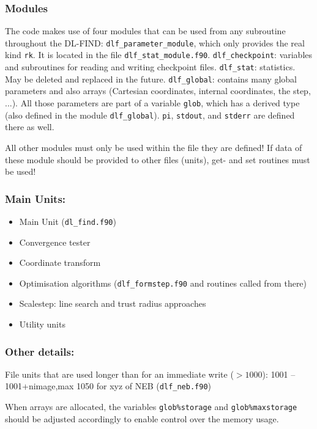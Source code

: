 \documentclass{article}
\begin{document}
\subsubsection{Modules}

The code makes use of four modules that can be used from any subroutine
throughout the DL-FIND: \texttt{dlf\_parameter\_module}, which only provides
the real kind \texttt{rk}. It is located in the file
\texttt{dlf\_stat\_module.f90}.  \texttt{dlf\_checkpoint}: variables and
subroutines for reading and writing checkpoint files. \texttt{dlf\_stat}:
statistics. May be deleted and replaced in the future.  \texttt{dlf\_global}:
contains many global parameters and also arrays (Cartesian coordinates,
internal coordinates, the step, ...). All those parameters are part of a
variable \texttt{glob}, which has a derived type (also defined in the module
\texttt{dlf\_global}). \texttt{pi}, \texttt{stdout}, and \texttt{stderr} are
defined there as well.

All other modules must only be used within the file they are defined! If data
of these module should be provided to other files (units), get- and set
routines must be used!

\subsubsection{Main Units:}

\begin{itemize}
\item Main Unit (\texttt{dl\_find.f90})
\item Convergence tester 
\item Coordinate transform
\item Optimisation algorithms (\texttt{dlf\_formstep.f90} and routines called
  from there)
\item Scalestep: line search and trust radius approaches
\item Utility units
\end{itemize}

\subsubsection{Other details:}

File units that are used longer than for an immediate write ($>1000$):
1001 -- 1001+nimage,max 1050 for xyz of NEB (\texttt{dlf\_neb.f90})
     
When arrays are allocated, the variables \texttt{glob\%storage} and
\texttt{glob\%maxstorage} should be adjusted accordingly to enable control
over the memory usage.
\end{document}
